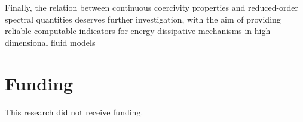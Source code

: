 \documentclass[preprint,12pt]{elsarticle}
\begin{document}
Finally, the relation between continuous coercivity properties and reduced-order
spectral quantities deserves further investigation, with the aim of providing
reliable computable indicators for energy-dissipative mechanisms in
high-dimensional fluid models
\section*{Funding}
This research did not receive funding.




%  
% 
\end{document}
